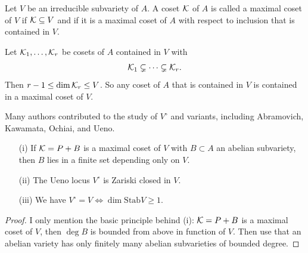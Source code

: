 \documentclass{beamer}
\begin{document}
\begin{frame}
  \begin{definition}
    Let $V$ be an irreducible subvariety of $A$. A coset ${\mathcal K}$ of $A$ is
    called a \alert{maximal coset} of $V$ if ${\mathcal K}\subseteq V$ and if it is
    a maximal coset of $A$ with respect to inclusion that is contained
    in $V$. 
  \end{definition}

  Let ${\mathcal K}_1,\ldots,{\mathcal K}_r$ be cosets of $A$ contained in $V$ with
  $${\mathcal K}_1\subsetneq \cdots\subsetneq {\mathcal K}_r.$$
  Then $r-1\le \dim {\mathcal K}_r\le V$. So
  any coset  of $A$ that is contained in $V$ is contained in a maximal
  coset of $V$.
\end{frame}

\begin{frame}
  Many authors contributed to the study of $V^{\circ}$ and variants, including
  Abramovich, Kawamata, Ochiai, and Ueno.

  
  \begin{theorem} 
    \begin{enumerate}
    \item [(i)] If ${\mathcal K}=P+B$ is a \alert{maximal} coset of $V$ with $B\subset
      A$ an abelian subvariety, then $B$ lies in a finite set
      depending only on $V$. 
    \item[(ii)] The Ueno locus $V^{\circ}$ is \alert{Zariski closed} in $V$.
    \item[(iii)] We have $V^{\circ} = V\Longleftrightarrow
      \dim\mathrm{Stab} V\ge
      1$. 
    \end{enumerate}
  \end{theorem}
  \begin{proof}\renewcommand{\qedsymbol}{}
    I only mention the basic principle behind (i):
      ${\mathcal K}=P+B$ is a maximal
    coset of $V$, then $\deg B$ is bounded from above in function of
    $V$. Then use that an abelian variety has only finitely many
    abelian subvarieties of bounded degree. 
  \end{proof}
\end{frame}
\end{document}
